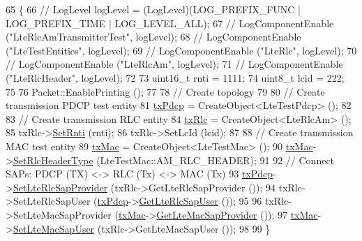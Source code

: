 \begin{DoxyCode}
65 \{
66   \textcolor{comment}{// LogLevel logLevel = (LogLevel)(LOG\_PREFIX\_FUNC | LOG\_PREFIX\_TIME | LOG\_LEVEL\_ALL);}
67   \textcolor{comment}{// LogComponentEnable ("LteRlcAmTransmitterTest", logLevel);}
68   \textcolor{comment}{// LogComponentEnable ("LteTestEntities", logLevel);}
69   \textcolor{comment}{// LogComponentEnable ("LteRlc", logLevel);}
70   \textcolor{comment}{// LogComponentEnable ("LteRlcAm", logLevel);}
71   \textcolor{comment}{// LogComponentEnable ("LteRlcHeader", logLevel);}
72 
73   uint16\_t rnti = 1111;
74   uint8\_t lcid = 222;
75 
76   Packet::EnablePrinting ();
77 
78   \textcolor{comment}{// Create topology}
79 
80   \textcolor{comment}{// Create transmission PDCP test entity}
81   \hyperlink{classLteRlcAmTransmitterTestCase_a05f1f1654108d96efa96f08f3cfa9157}{txPdcp} = CreateObject<LteTestPdcp> ();
82 
83   \textcolor{comment}{// Create transmission RLC entity}
84   \hyperlink{classLteRlcAmTransmitterTestCase_ae91b4ccc5c47381419e1cc945ffbd500}{txRlc} = CreateObject<LteRlcAm> ();
85   txRlc->\hyperlink{classns3_1_1LteRlc_aaa523544e1f9a29104a343333741f498}{SetRnti} (rnti);
86   txRlc->SetLcId (lcid);
87 
88   \textcolor{comment}{// Create transmission MAC test entity}
89   \hyperlink{classLteRlcAmTransmitterTestCase_aef4a21987514cf7f0b7a71794022f096}{txMac} = CreateObject<LteTestMac> ();
90   \hyperlink{classLteRlcAmTransmitterTestCase_aef4a21987514cf7f0b7a71794022f096}{txMac}->\hyperlink{classns3_1_1LteTestMac_acbe465027c32200d31d1785419993ddd}{SetRlcHeaderType} (LteTestMac::AM\_RLC\_HEADER);
91 
92   \textcolor{comment}{// Connect SAPs: PDCP (TX) <-> RLC (Tx) <-> MAC (Tx)}
93   \hyperlink{classLteRlcAmTransmitterTestCase_a05f1f1654108d96efa96f08f3cfa9157}{txPdcp}->\hyperlink{classns3_1_1LteTestPdcp_a47f07d4c2e6e1b06d5d5103c7678cb06}{SetLteRlcSapProvider} (txRlc->GetLteRlcSapProvider ());
94   txRlc->SetLteRlcSapUser (\hyperlink{classLteRlcAmTransmitterTestCase_a05f1f1654108d96efa96f08f3cfa9157}{txPdcp}->\hyperlink{classns3_1_1LteTestPdcp_a3893283fd40b527e935ae025ac1a813e}{GetLteRlcSapUser} ());
95 
96   txRlc->SetLteMacSapProvider (\hyperlink{classLteRlcAmTransmitterTestCase_aef4a21987514cf7f0b7a71794022f096}{txMac}->\hyperlink{classns3_1_1LteTestMac_aca0bc578effe20c77f51c7a39c8f089e}{GetLteMacSapProvider} ());
97   \hyperlink{classLteRlcAmTransmitterTestCase_aef4a21987514cf7f0b7a71794022f096}{txMac}->\hyperlink{classns3_1_1LteTestMac_a234317bfc20d9f149bfbd36546a50d4b}{SetLteMacSapUser} (txRlc->GetLteMacSapUser ());
98 
99 \}
\end{DoxyCode}


